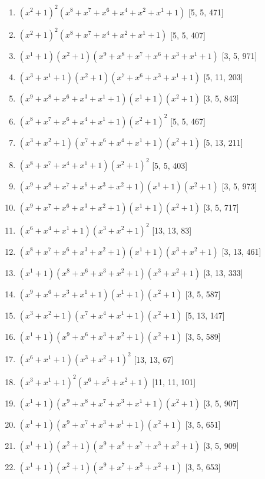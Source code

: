 \documentclass[10pt,twocolumn]{article}
\begin{document}
\begin{enumerate}
\item $(x^{2} + 1)^{2}(x^{8} + x^{7} + x^{6} + x^{4} + x^{2} + x^{1} + 1)$  [5, 5, 471]
\item $(x^{2} + 1)^{2}(x^{8} + x^{7} + x^{4} + x^{2} + x^{1} + 1)$  [5, 5, 407]
\item $(x^{1} + 1)(x^{2} + 1)(x^{9} + x^{8} + x^{7} + x^{6} + x^{3} + x^{1} + 1)$  [3, 5, 971]
\item $(x^{3} + x^{1} + 1)(x^{2} + 1)(x^{7} + x^{6} + x^{3} + x^{1} + 1)$  [5, 11, 203]
\item $(x^{9} + x^{8} + x^{6} + x^{3} + x^{1} + 1)(x^{1} + 1)(x^{2} + 1)$  [3, 5, 843]
\item $(x^{8} + x^{7} + x^{6} + x^{4} + x^{1} + 1)(x^{2} + 1)^{2}$  [5, 5, 467]
\item $(x^{3} + x^{2} + 1)(x^{7} + x^{6} + x^{4} + x^{1} + 1)(x^{2} + 1)$  [5, 13, 211]
\item $(x^{8} + x^{7} + x^{4} + x^{1} + 1)(x^{2} + 1)^{2}$  [5, 5, 403]
\item $(x^{9} + x^{8} + x^{7} + x^{6} + x^{3} + x^{2} + 1)(x^{1} + 1)(x^{2} + 1)$  [3, 5, 973]
\item $(x^{9} + x^{7} + x^{6} + x^{3} + x^{2} + 1)(x^{1} + 1)(x^{2} + 1)$  [3, 5, 717]
\item $(x^{6} + x^{4} + x^{1} + 1)(x^{3} + x^{2} + 1)^{2}$  [13, 13, 83]
\item $(x^{8} + x^{7} + x^{6} + x^{3} + x^{2} + 1)(x^{1} + 1)(x^{3} + x^{2} + 1)$  [3, 13, 461]
\item $(x^{1} + 1)(x^{8} + x^{6} + x^{3} + x^{2} + 1)(x^{3} + x^{2} + 1)$  [3, 13, 333]
\item $(x^{9} + x^{6} + x^{3} + x^{1} + 1)(x^{1} + 1)(x^{2} + 1)$  [3, 5, 587]
\item $(x^{3} + x^{2} + 1)(x^{7} + x^{4} + x^{1} + 1)(x^{2} + 1)$  [5, 13, 147]
\item $(x^{1} + 1)(x^{9} + x^{6} + x^{3} + x^{2} + 1)(x^{2} + 1)$  [3, 5, 589]
\item $(x^{6} + x^{1} + 1)(x^{3} + x^{2} + 1)^{2}$  [13, 13, 67]
\item $(x^{3} + x^{1} + 1)^{2}(x^{6} + x^{5} + x^{2} + 1)$  [11, 11, 101]
\item $(x^{1} + 1)(x^{9} + x^{8} + x^{7} + x^{3} + x^{1} + 1)(x^{2} + 1)$  [3, 5, 907]
\item $(x^{1} + 1)(x^{9} + x^{7} + x^{3} + x^{1} + 1)(x^{2} + 1)$  [3, 5, 651]
\item $(x^{1} + 1)(x^{2} + 1)(x^{9} + x^{8} + x^{7} + x^{3} + x^{2} + 1)$  [3, 5, 909]
\item $(x^{1} + 1)(x^{2} + 1)(x^{9} + x^{7} + x^{3} + x^{2} + 1)$  [3, 5, 653]

\end{enumerate}
\end{document}
